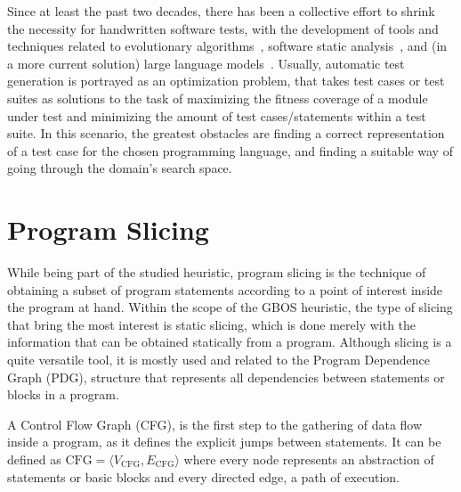 \documentclass[%
  chapterprefix=false,%
  open=right,%
  twoside=true,%
  paper=a4,%
  logofile={Figures/logo.png},%
  thesistype=master,%
  UKenglish,%
]{se2thesis}
\begin{document}
Since at least the past two decades, there has been a collective effort to shrink the necessity for handwritten software tests, with the development of tools and techniques related to evolutionary algorithms~\cite{DBLP:conf/sigsoft/FraserA11}, software static analysis~\cite{DBLP:conf/osdi/CadarDE08}, and (in a more current solution) large language models~\cite{DBLP:journals/corr/abs-2207-10397}.
Usually, automatic test generation is portrayed as an optimization problem, that takes test cases or test suites as solutions to the task of maximizing the fitness coverage of a module under test and minimizing the amount of test cases/statements within a test suite.
In this scenario, the greatest obstacles are finding a correct representation of a test case for the chosen programming language, and finding a suitable way of going through the domain's search space.

\newpage

\section{Program Slicing}\label{sec:slicing}

While being part of the studied heuristic, program slicing is the technique of obtaining a subset of program statements according to a point of interest inside the program at hand.
Within the scope of the GBOS heuristic, the type of slicing that bring the most interest is static slicing, which is done merely with the information that can be obtained statically from a program.
Although slicing is a quite versatile tool, it is mostly used and related to the Program Dependence Graph (PDG), structure that represents all dependencies between statements or blocks in a program.

A Control Flow Graph (CFG), is the first step to the gathering of data flow inside a program, as it defines the explicit jumps between statements.
It can be defined as \(\text{CFG} = \langle V_{\text{CFG}}, E_{\text{CFG}} \rangle\) where every node represents an abstraction of statements or basic blocks and every directed edge, a path of execution.
\end{document}
